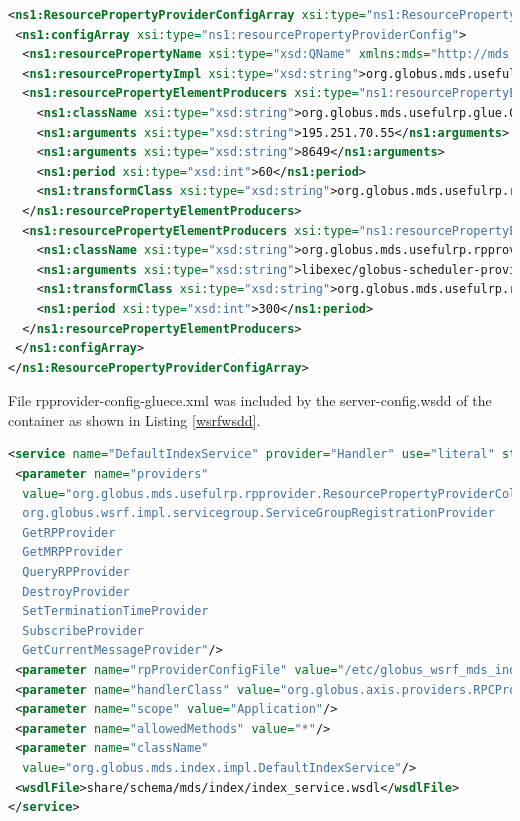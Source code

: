 \begin{lstlisting}[language=XML,caption=Ganglia Resource Provider for WSRF Index,label=wsrfrp]
<ns1:ResourcePropertyProviderConfigArray xsi:type="ns1:ResourcePropertyProviderConfigArray" xmlns:ns1="http://mds.globus.org/rpprovider/2005/08" xmlns:xsi="http://www.w3.org/2001/XMLSchema-instance">
 <ns1:configArray xsi:type="ns1:resourcePropertyProviderConfig">
  <ns1:resourcePropertyName xsi:type="xsd:QName" xmlns:mds="http://mds.globus.org/glue/ce/1.1">mds:GLUECE</ns1:resourcePropertyName>
  <ns1:resourcePropertyImpl xsi:type="xsd:string">org.globus.mds.usefulrp.rpprovider.GLUEResourceProperty</ns1:resourcePropertyImpl>
  <ns1:resourcePropertyElementProducers xsi:type="ns1:resourcePropertyElementProducerConfig">
    <ns1:className xsi:type="xsd:string">org.globus.mds.usefulrp.glue.GangliaElementProducer</ns1:className>
    <ns1:arguments xsi:type="xsd:string">195.251.70.55</ns1:arguments>
    <ns1:arguments xsi:type="xsd:string">8649</ns1:arguments>
    <ns1:period xsi:type="xsd:int">60</ns1:period>
    <ns1:transformClass xsi:type="xsd:string">org.globus.mds.usefulrp.rpprovider.transforms.GLUEComputeElementTransform</ns1:transformClass>
  </ns1:resourcePropertyElementProducers>
  <ns1:resourcePropertyElementProducers xsi:type="ns1:resourcePropertyElementProducerConfig">
    <ns1:className xsi:type="xsd:string">org.globus.mds.usefulrp.rpprovider.producers.SchedulerInfoElementProducer</ns1:className>
    <ns1:arguments xsi:type="xsd:string">libexec/globus-scheduler-provider-fork</ns1:arguments>
    <ns1:transformClass xsi:type="xsd:string">org.globus.mds.usefulrp.rpprovider.transforms.GLUESchedulerElementTransform</ns1:transformClass>
    <ns1:period xsi:type="xsd:int">300</ns1:period>
  </ns1:resourcePropertyElementProducers>
 </ns1:configArray>
</ns1:ResourcePropertyProviderConfigArray>
\end{lstlisting}

File rpprovider-config-gluece.xml was included by the server-config.wsdd of the container as shown in Listing \ref{wsrfwsdd}.

\begin{lstlisting}[language=XML,caption=Web Service Deployment Descriptor for WSRF Index,label=wsrfwsdd]
<service name="DefaultIndexService" provider="Handler" use="literal" style="document">
 <parameter name="providers"
  value="org.globus.mds.usefulrp.rpprovider.ResourcePropertyProviderCollection
  org.globus.wsrf.impl.servicegroup.ServiceGroupRegistrationProvider
  GetRPProvider
  GetMRPProvider
  QueryRPProvider
  DestroyProvider
  SetTerminationTimeProvider
  SubscribeProvider
  GetCurrentMessageProvider"/>
 <parameter name="rpProviderConfigFile" value="/etc/globus_wsrf_mds_index/rpprovider-config-gluece.xml"/>
 <parameter name="handlerClass" value="org.globus.axis.providers.RPCProvider"/>
 <parameter name="scope" value="Application"/>
 <parameter name="allowedMethods" value="*"/>
 <parameter name="className"
  value="org.globus.mds.index.impl.DefaultIndexService"/>
 <wsdlFile>share/schema/mds/index/index_service.wsdl</wsdlFile>
</service>
\end{lstlisting}

